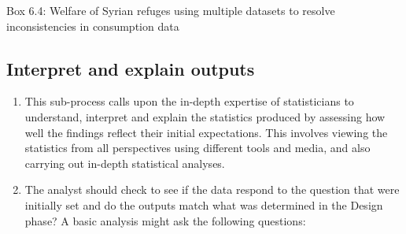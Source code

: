 \documentclass[
]{article}
\begin{document}
Box 6.4: Welfare of Syrian refuges using multiple datasets to resolve
inconsistencies in consumption data

\hypertarget{section}{%
\subsubsection{}\label{section}}

\hypertarget{interpret-and-explain-outputs}{%
\subsection{Interpret and explain outputs}\label{interpret-and-explain-outputs}}

\begin{enumerate}
\def\labelenumi{\arabic{enumi}.}
\setcounter{enumi}{472}
\item
  This sub-process calls upon the in-depth expertise of statisticians
  to understand, interpret and explain the statistics produced by
  assessing how well the findings reflect their initial expectations.
  This involves viewing the statistics from all perspectives using
  different tools and media, and also carrying out in-depth
  statistical analyses.
\item
  The analyst should check to see if the data respond to the question
  that were initially set and do the outputs match what was determined
  in the Design phase? A basic analysis might ask the following
  questions:
\end{enumerate}
\end{document}
